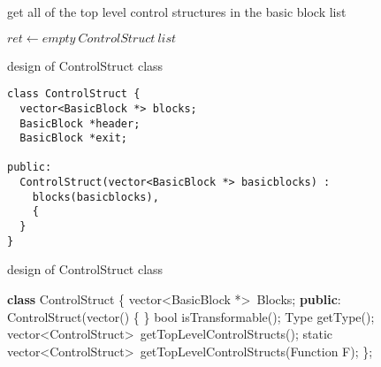 \documentclass{article}
\begin{document}
\begin{algorithm}
  \caption{get all of the top level control structures in the basic block list}
  \begin{algorithmic}[1]
      \State $ret \gets empty\ ControlStruct\ list$
          \Else
          \EndIf
         
        \EndIf
      \EndFor
    \EndFunction
  \end{algorithmic}
\end{algorithm}

\FloatBarrier
design of ControlStruct class
\begin{lstlisting}[languag=C++]
class ControlStruct {
  vector<BasicBlock *> blocks;
  BasicBlock *header;
  BasicBlock *exit;

public:
  ControlStruct(vector<BasicBlock *> basicblocks) :
    blocks(basicblocks),
    {
  }
}
\end{lstlisting}

\renewcommand{\thealgorithm}{}
\begin{algorithm}
  \caption{design of ControlStruct class}
  \begin{algorithmic}[1]
    \State \textbf{class} ControlStruct \{
    \State vector\textless BasicBlock *\textgreater\ Blocks;
    \State
    \State \textbf{public}:
    \State ControlStruct(vector() \{
    \State \}
    \State
    \State bool isTransformable();
    \State
    \State Type getType();
    \State
    \State vector\textless ControlStruct\textgreater\ getTopLevelControlStructs();
    \State
    \State static vector\textless ControlStruct\textgreater\ getTopLevelControlStructs(Function F);
    \State \};
  \end{algorithmic}
\end{algorithm}
\end{document}
